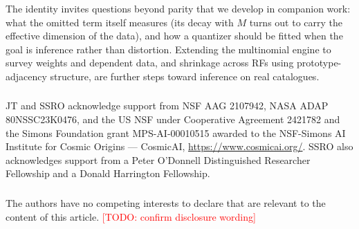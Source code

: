 \documentclass[runningheads]{llncs}
\newcommand{\todo}[1]{\textcolor{red}{[TODO: #1]}}
\begin{document}
The identity invites questions beyond parity that we develop in companion work: what the omitted term itself measures (its decay with $M$ turns out to carry the effective dimension of the data), and how a quantizer should be fitted when the goal is inference rather than distortion. Extending the multinomial engine to survey weights and dependent data, and shrinkage across RFs using prototype-adjacency structure, are further steps toward inference on real catalogues.

\begin{credits}
\subsubsection{\ackname} JT and SSRO acknowledge support from NSF AAG 2107942, NASA ADAP 80NSSC23K0476, and the US NSF under Cooperative Agreement 2421782 and the Simons Foundation grant MPS-AI-00010515 awarded to the NSF-Simons AI Institute for Cosmic Origins --- CosmicAI, \url{https://www.cosmicai.org/}. SSRO also acknowledges support from a Peter O'Donnell Distinguished Researcher Fellowship and a Donald Harrington Fellowship.
\subsubsection{\discintname} The authors have no competing interests to declare that are relevant to the content of this article. \todo{confirm disclosure wording}
\end{credits}



\end{document}
